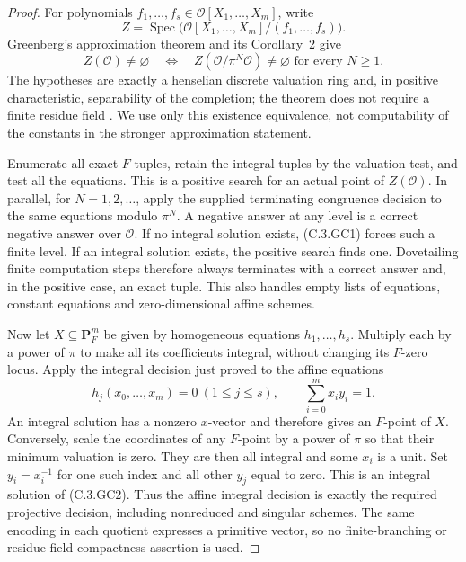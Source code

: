 \begin{proof}
For polynomials $f_1,\ldots,f_s\in\mathcal O[X_1,\ldots,X_m]$,
write
\[
 Z=\operatorname{Spec}\bigl(\mathcal O[X_1,\ldots,X_m]/(f_1,\ldots,f_s)\bigr).
\]
Greenberg's approximation theorem and its Corollary~2 give
\[
 Z(\mathcal O)\ne\varnothing
 \quad\Longleftrightarrow\quad
 Z(\mathcal O/\pi^N\mathcal O)\ne\varnothing
       \text{ for every }N\ge1 .                    \tag{C.3.GC1}
\]
The hypotheses are exactly a henselian discrete valuation ring
and, in positive characteristic, separability of the completion;
the theorem does not require a finite residue field
\cite[Theorem 1 and Corollary 2, p.\ 59, with proof pp.\ 60--64]
{C-Greenberg1966}.  We use only this existence equivalence, not
computability of the constants in the stronger approximation statement.

Enumerate all exact $F$-tuples, retain the integral tuples by the
valuation test, and test all the equations.  This is a positive
search for an actual point of $Z(\mathcal O)$.
In parallel, for $N=1,2,\ldots$, apply the supplied terminating
congruence decision to the same equations modulo $\pi^N$.
A negative answer at any level is a correct negative answer over
$\mathcal O$.  If no integral solution exists, (C.3.GC1) forces
such a finite level.  If an integral solution exists, the positive
search finds one.  Dovetailing finite computation steps therefore
always terminates with a correct answer and, in the positive case,
an exact tuple.  This also handles empty lists of equations,
constant equations and zero-dimensional affine schemes.

Now let $X\subseteq\mathbf P_F^m$ be given by homogeneous equations
$h_1,\ldots,h_s$.  Multiply each by a power of $\pi$ to make all
its coefficients integral, without changing its $F$-zero locus.
Apply the integral decision just proved to the affine equations
\[
 h_j(x_0,\ldots,x_m)=0\ (1\le j\le s),
 \qquad \sum_{i=0}^m x_i y_i=1.                     \tag{C.3.GC2}
\]
An integral solution has a nonzero $x$-vector and therefore gives
an $F$-point of $X$.  Conversely, scale the coordinates of any
$F$-point by a power of $\pi$ so that their minimum valuation is
zero.  They are then all integral and some $x_i$ is a unit.
Set $y_i=x_i^{-1}$ for one such index and all other $y_j$ equal
to zero.  This is an integral solution of (C.3.GC2).
Thus the affine integral decision is exactly the required projective
decision, including nonreduced and singular schemes.  The same
encoding in each quotient expresses a primitive vector, so no
finite-branching or residue-field compactness assertion is used.


\end{proof}
